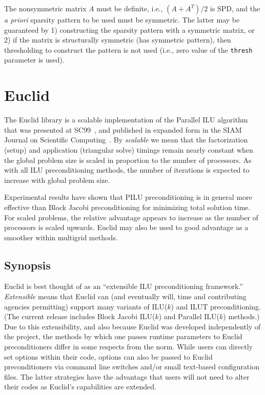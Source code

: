 The nonsymmetric matrix $A$ must be definite,
i.e., $(A+A^T)/2$ is SPD, and the {\em a priori} sparsity pattern to be used
must be symmetric.  The latter may be guaranteed by 1) 
constructing the sparsity pattern with a symmetric matrix, or 2) if the
matrix is structurally symmetric (has symmetric pattern), then
thresholding to construct the pattern is not used (i.e.,
zero value of the {\tt thresh} parameter is used).


\section{Euclid}

The Euclid library is a scalable implementation of the Parallel ILU algorithm
that was presented at SC99~\cite{DHysom_APothen_1999}, and published in
expanded form in the SIAM Journal on Scientific
Computing~\cite{DHysom_APothen_2001}.  By {\em scalable} we mean that the
factorization (setup) and application (triangular solve) timings remain nearly
constant when the global problem size is scaled in proportion to the number of
processors.  As with all ILU preconditioning methods, the number of iterations
is expected to increase with global problem size.

Experimental results have shown that PILU preconditioning is in general
more effective than Block Jacobi preconditioning 
for minimizing total solution time.
For scaled problems, the relative advantage appears to increase 
as the number of processors is scaled upwards.
Euclid may also be used to good advantage as a smoother within 
multigrid methods.


\subsection{Synopsis}

Euclid is best thought of as an ``extensible ILU preconditioning
framework.''
{\em Extensible} means that Euclid can (and eventually will, time and
contributing agencies permitting) support many variants of ILU($k$)
and ILUT preconditioning.
(The current release includes Block Jacobi ILU($k$) and
Parallel ILU($k$) methods.)
Due to this extensibility, and also because Euclid was developed 
independently of the \hypre{} project, the methods by which one
passes runtime parameters to Euclid preconditioners
differ in some respects from the \hypre{} norm.
While users can directly set options within their code,
options can also be passed to Euclid preconditioners via
command line switches and/or small text-based configuration files.
The latter strategies have the advantage that users will not need to
alter their codes as Euclid's capabilities are extended.

